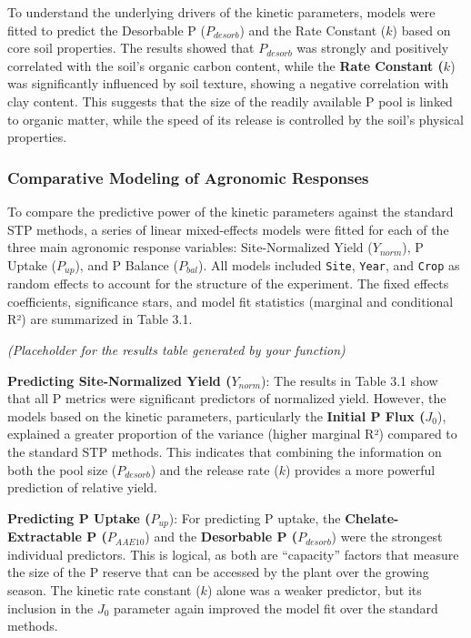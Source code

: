 \documentclass[
  a4paper,
]{article}
\begin{document}
To understand the underlying drivers of the kinetic parameters, models
were fitted to predict the Desorbable P (\(P_{desorb}\)) and the Rate
Constant (\(k\)) based on core soil properties. The results showed that
\(P_{desorb}\) was strongly and positively correlated with the soil's
organic carbon content, while the \textbf{Rate Constant (}\(k\)) was
significantly influenced by soil texture, showing a negative correlation
with clay content. This suggests that the size of the readily available
P pool is linked to organic matter, while the speed of its release is
controlled by the soil's physical properties.

\subsubsection{Comparative Modeling of Agronomic
Responses}\label{comparative-modeling-of-agronomic-responses}

To compare the predictive power of the kinetic parameters against the
standard STP methods, a series of linear mixed-effects models were
fitted for each of the three main agronomic response variables:
Site-Normalized Yield (\(Y_{norm}\)), P Uptake (\(P_{up}\)), and P
Balance (\(P_{bal}\)). All models included \texttt{Site}, \texttt{Year},
and \texttt{Crop} as random effects to account for the structure of the
experiment. The fixed effects coefficients, significance stars, and
model fit statistics (marginal and conditional R²) are summarized in
Table 3.1.

\emph{(Placeholder for the results table generated by your function)}

\textbf{Predicting Site-Normalized Yield (}\(Y_{norm}\)): The results in
Table 3.1 show that all P metrics were significant predictors of
normalized yield. However, the models based on the kinetic parameters,
particularly the \textbf{Initial P Flux (}\(J_0\)), explained a greater
proportion of the variance (higher marginal R²) compared to the standard
STP methods. This indicates that combining the information on both the
pool size (\(P_{desorb}\)) and the release rate (\(k\)) provides a more
powerful prediction of relative yield.

\textbf{Predicting P Uptake (}\(P_{up}\)): For predicting P uptake, the
\textbf{Chelate-Extractable P (}\(P_{AAE10}\)) and the
\textbf{Desorbable P (}\(P_{desorb}\)) were the strongest individual
predictors. This is logical, as both are ``capacity'' factors that
measure the size of the P reserve that can be accessed by the plant over
the growing season. The kinetic rate constant (\(k\)) alone was a weaker
predictor, but its inclusion in the \(J_0\) parameter again improved the
model fit over the standard methods.
\end{document}
